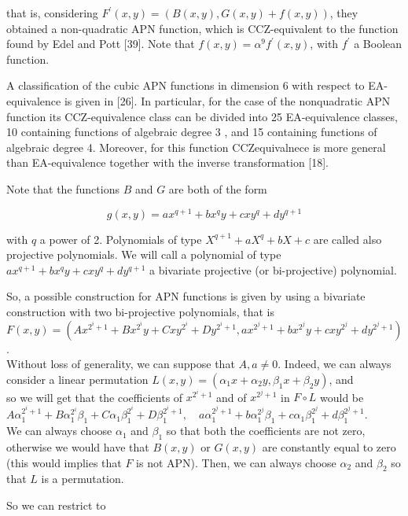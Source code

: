 \documentclass[10pt]{article}
\begin{document}
that is, considering $F^{\prime}(x, y)=(B(x, y), G(x, y)+f(x, y))$, they obtained a non-quadratic APN function, which is CCZ-equivalent to the function found by Edel and Pott [39]. Note that $f(x, y)=\alpha^{9} f^{\prime}(x, y)$, with $f^{\prime}$ a Boolean function.

A classification of the cubic APN functions in dimension 6 with respect to EA-equivalence is given in [26]. In particular, for the case of the nonquadratic APN function its CCZ-equivalence class can be divided into 25 EA-equivalence classes, 10 containing functions of algebraic degree 3 , and 15 containing functions of algebraic degree 4. Moreover, for this function CCZequivalnece is more general than EA-equivalence together with the inverse transformation [18].

Note that the functions $B$ and $G$ are both of the form

$$
g(x, y)=a x^{q+1}+b x^{q} y+c x y^{q}+d y^{q+1}
$$

with $q$ a power of 2. Polynomials of type $X^{q+1}+a X^{q}+b X+c$ are called also projective polynomials. We will call a polynomial of type $a x^{q+1}+b x^{q} y+ c x y^{q}+d y^{q+1}$ a bivariate projective (or bi-projective) polynomial.

So, a possible construction for APN functions is given by using a bivariate construction with two bi-projective polynomials, that is\\
$F(x, y)=\left(A x^{2^{i}+1}+B x^{2^{i}} y+C x y^{2^{i}}+D y^{2^{i}+1}, a x^{2^{j}+1}+b x^{2^{j}} y+c x y^{2^{j}}+d y^{2^{j}+1}\right)$.\\
Without loss of generality, we can suppose that $A, a \neq 0$. Indeed, we can always consider a linear permutation $L(x, y)=\left(\alpha_{1} x+\alpha_{2} y, \beta_{1} x+\beta_{2} y\right)$, and\\
so we will get that the coefficients of $x^{2^{i}+1}$ and of $x^{2^{j}+1}$ in $F \circ L$ would be $A \alpha_{1}^{2^{i}+1}+B \alpha_{1}^{2^{i}} \beta_{1}+C \alpha_{1} \beta_{1}^{2^{i}}+D \beta_{1}^{2^{i}+1}, \quad a \alpha_{1}^{2^{j}+1}+b \alpha_{1}^{2^{j}} \beta_{1}+c \alpha_{1} \beta_{1}^{2^{j}}+d \beta_{1}^{2^{j}+1}$.\\
We can always choose $\alpha_{1}$ and $\beta_{1}$ so that both the coefficients are not zero, otherwise we would have that $B(x, y)$ or $G(x, y)$ are constantly equal to zero (this would implies that $F$ is not APN). Then, we can always choose $\alpha_{2}$ and $\beta_{2}$ so that $L$ is a permutation.

So we can restrict to
\end{document}
